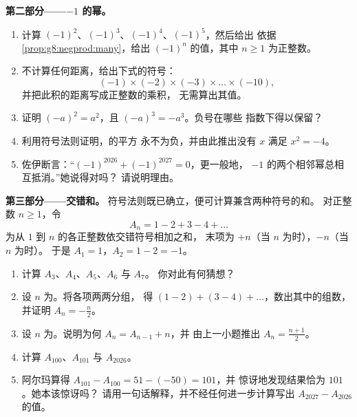 \begin{problem}
\medskip
\noindent\textbf{第二部分——$-1$ 的幂。}
\begin{enumerate}[resume]
  \item 计算 $(-1)^2$、$(-1)^3$、$(-1)^4$、$(-1)^5$，然后给出
        依据\cref{prop:g8:negprod:many}，给出
        $(-1)^n$ 的值，其中 $n \geq 1$ 为正整数。
  \item 不计算任何距离，给出下式的符号：
        \[
        (-1) \times (-2) \times (-3) \times \dots \times (-10),
        \]
        并把此积的距离写成正整数的乘积，
        无需算出其值。
  \item 证明 $(-a)^2 = a^2$，且 $(-a)^3 = -a^3$。负号在哪些
        指数下得以保留？
  \item 利用符号法则证明，的平方
        永不为负，并由此推出没有
        $x$ 满足 $x^2 = -4$。
  \item 佐伊断言：“$(-1)^{2026} + (-1)^{2027} = 0$，更一般地，
        $-1$ 的两个相邻幂总相互抵消。”她说得对吗？
        请说明理由。
\end{enumerate}

\medskip
\noindent\textbf{第三部分——交错和。}
符号法则既已确立，便可计算兼含两种符号的和。
对正整数 $n \geq 1$，令
\[
A_n = 1 - 2 + 3 - 4 + \dots
\]
为从 $1$ 到 $n$ 的各正整数依交错符号相加之和，
末项为 $+n$（当 $n$ 为时），$-n$（当 $n$ 为时）。
于是 $A_1 = 1$，$A_2 = 1 - 2 = -1$。
\begin{enumerate}[resume]
  \item 计算 $A_3$、$A_4$、$A_5$、$A_6$ 与 $A_7$。
        你对此有何猜想？
  \item 设 $n$ 为。将各项两两分组，
        得 $(1 - 2) + (3 - 4) + \dots$，数出其中的组数，并证明
        $A_n = -\frac{n}{2}$。
  \item 设 $n$ 为。说明为何 $A_n = A_{n-1} + n$，并
        由上一小题推出
        $A_n = \frac{n + 1}{2}$。
  \item 计算 $A_{100}$、$A_{101}$ 与 $A_{2026}$。
  \item 阿尔玛算得 $A_{101} - A_{100} = 51 - (-50) = 101$，并
        惊讶地发现结果恰为 $101$。她本该惊讶吗？
        请用一句话解释，并不经任何进一步计算写出
        $A_{2027} - A_{2026}$ 的值。
\end{enumerate}
\end{problem}
